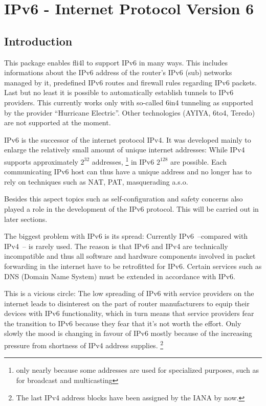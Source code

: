 \section{IPv6 - Internet Protocol Version 6}

\subsection{Introduction}

This package enables fli4l to support IPv6 in many ways. This includes 
informations about the IPv6 address of the router's IPv6 (sub) networks managed 
by it, predefined IPv6 routes and firewall rules regarding IPv6 packets. 
Last but no least it is possible to automatically establish tunnels 
to IPv6 providers. This currently works only with so-called 6in4 tunneling 
as supported by the provider ``Hurricane Electric''. Other technologies (AYIYA, 
6to4, Teredo) are not supported at the moment.

IPv6 is the successor of the internet protocol IPv4. It was developed mainly 
to enlarge the relatively small amount of unique internet addresses: While 
IPv4 supports approximately \(2^{32}\) addresses, \footnote{only nearly because 
some addresses are used for specialized purposes, such as for broadcast and
multicasting} in IPv6 \(2^{128}\) are possible. Each communicating IPv6 host 
can thus have a unique address and no longer has to rely on techniques such 
as NAT, PAT, masquerading a.s.o.

Besides this aspect topics such as self-configuration and safety concerns also 
played a role in the development of the IPv6 protocol. This will be carried out 
in later sections.

The biggest problem with IPv6 is its spread: Currently IPv6~--compared with 
IPv4~-- is rarely used. The reason is that IPv6 and IPv4 are technically 
incompatible and thus all software and hardware components involved in packet 
forwarding in the internet have to be retrofitted for IPv6. Certain services 
such as DNS (Domain Name System) must be extended in accordance with IPv6.

This is a vicious circle: The low spreading of IPv6 with service providers 
on the internet leads to disinterest on the part of router manufacturers to 
equip their devices with IPv6 functionality, which in turn means that service 
providers fear the transition to IPv6 because they fear that it's not worth 
the effort. Only slowly the mood is changing in favour of IPv6 mostly because 
of the increasing pressure from shortness of IPv4 address supplies. \footnote{The 
last IPv4 address blocks have been assigned by the IANA by now.}

